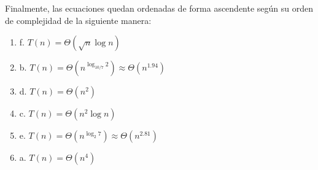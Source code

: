 \documentclass{article}
\begin{document}
Finalmente, las ecuaciones quedan ordenadas de forma ascendente según su orden de complejidad de la siguiente manera:

\begin{enumerate}
    \item f. $T(n) = \Theta (\sqrt{n} \log n)$
    \item b. $T(n) = \Theta (n^{\log_{10/7} 2}) \approx \Theta (n^{1.94})$
    \item d. $T(n) = \Theta (n^2)$
    \item c. $T(n) = \Theta (n^2 \log n)$
    \item e. $T(n) = \Theta (n^{\log_2 7}) \approx \Theta (n^{2.81})$
    \item a. $T(n) = \Theta (n^4)$
\end{enumerate}
\end{document}
